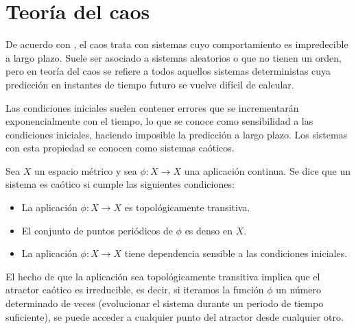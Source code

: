 \section{Teoría del caos}

De acuerdo con \cite{Simon2025_caos}, el caos trata con sistemas cuyo comportamiento es impredecible a largo plazo. Suele ser asociado a sistemas aleatorios o que no tienen un orden, pero en teoría del caos se refiere a todos aquellos sistemas deterministas cuya predicción en instantes de tiempo futuro se vuelve difícil de calcular. 

Las condiciones iniciales suelen contener errores que se incrementarán exponencialmente con el tiempo, lo que se conoce como sensibilidad a las condiciones iniciales, haciendo imposible la predicción a largo plazo. Los sistemas con esta propiedad se conocen como sistemas caóticos.

\begin{definition}
	Sea $X$ un espacio métrico y sea $\phi: X \to X$ una aplicación continua. Se dice que un sistema es caótico si cumple las siguientes condiciones:
	
	\begin{itemize}
		\item La aplicación $\phi: X \to X$ es topológicamente transitiva. 
		\item El conjunto de puntos periódicos de $\phi$ es denso en $X$.  
		\item La aplicación $\phi: X \to X$ tiene dependencia sensible a las condiciones iniciales. 
	\end{itemize}	
	
\end{definition}

El hecho de que la aplicación sea topológicamente transitiva implica que el atractor caótico es irreducible, es decir, si iteramos la función $\phi$ un número determinado de veces (evolucionar el sistema durante un periodo de tiempo suficiente), se puede acceder a cualquier punto del atractor desde cualquier otro.

